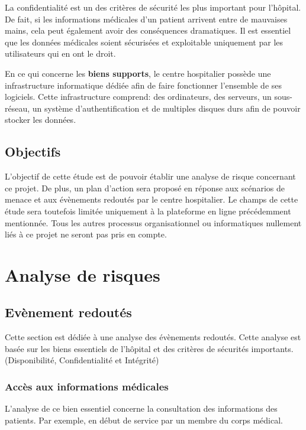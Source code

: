 \documentclass[12pt]{article}
\begin{document}
\justify
La confidentialité est un des critères de sécurité les plus important pour l'hôpital. De fait, si les informations médicales d'un patient arrivent entre de mauvaises mains, cela peut également avoir des conséquences dramatiques. Il est essentiel que les données médicales soient sécurisées et exploitable uniquement par les utilisateurs qui en ont le droit.

\justify
En ce qui concerne les \textbf{biens supports}, le centre hospitalier possède une infrastructure informatique dédiée afin de faire fonctionner l'ensemble de ses logiciels. Cette infrastructure comprend: des ordinateurs, des serveurs, un sous-réseau, un système d'authentification et de multiples disques durs afin de pouvoir stocker les données.

\subsection{Objectifs}

\justify
L'objectif de cette étude est de pouvoir établir une analyse de risque concernant ce projet. De plus, un plan d'action sera proposé en réponse aux scénarios de menace et aux évènements redoutés par le centre hospitalier. Le champs de cette étude sera toutefois limitée uniquement à la plateforme en ligne précédemment mentionnée. Tous les autres processus organisationnel ou informatiques nullement liés à ce projet ne seront pas pris en compte.

\section{Analyse de risques}

\subsection{Evènement redoutés}

Cette section est dédiée à une analyse des évènements redoutés. Cette analyse est basée sur les biens essentiels de l'hôpital et des critères de sécurités importants. (Disponibilité, Confidentialité et Intégrité)

\subsubsection{Accès aux informations médicales}

L'analyse de ce bien essentiel concerne la consultation des informations des patients. Par exemple, en début de service par un membre du corps médical.
\end{document}
